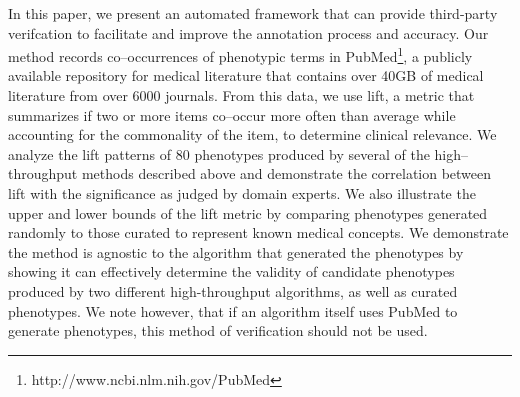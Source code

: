 \documentclass{sig-alternate}
\begin{document}
In this paper, we present an automated framework that can provide third-party verifcation to facilitate and improve the annotation process and accuracy.
Our method records co--occurrences of phenotypic terms in PubMed\footnote{http://www.ncbi.nlm.nih.gov/PubMed}, a publicly available repository for medical literature that contains over 40GB of medical literature from over 6000 journals. 
From this data, we use lift, a metric that summarizes if two or more items co--occur more often than average while accounting for the commonality of the item, to determine clinical relevance.
We analyze the lift patterns of 80 phenotypes produced by several of the high--throughput methods described above and demonstrate the correlation between lift with the significance as judged by domain experts.
We also illustrate the upper and lower bounds of the lift metric by comparing phenotypes generated randomly to those curated to represent known medical concepts.
We demonstrate the method is agnostic to the algorithm that generated the phenotypes by showing it can effectively determine the validity of candidate phenotypes produced by two different high-throughput algorithms, as well as curated phenotypes. We note however, that if an algorithm itself uses PubMed to generate phenotypes, this method of verification should not be used.
\end{document}
